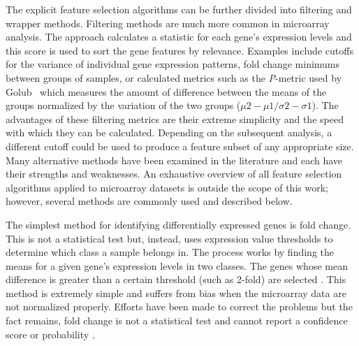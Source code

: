 {%
The explicit feature selection algorithms can be further divided into filtering
and wrapper methods. Filtering methods are much more common in microarray
analysis. The approach calculates a statistic for each gene's expression levels
and this score is used to sort the gene features by relevance.  Examples
include cutoffs for the variance of individual gene expression patterns, fold
change minimums between groups of samples, or calculated metrics such as the
\emph{P}-metric used by Golub \ea\ which measures the amount of difference
between the means of the groups normalized by the variation of the two groups
($\mu2 - \mu1 / \sigma2 - \sigma1$). The advantages of these filtering metrics
are their extreme simplicity and the speed with which they can be calculated.
Depending on the subsequent analysis, a different cutoff could be used to
produce a feature subset of any appropriate size.  Many alternative methods
have been examined in the literature and each have their strengths and
weaknesses.  An exhaustive overview of all feature selection algorithms applied
to microarray datasets is outside the scope of this work; however, several
methods are commonly used and described below. 






The simplest method for identifying differentially expressed genes is fold
change.  This is not a statistical test but, instead, uses expression value
thresholds to determine which class a sample belongs in.  The process works by
finding the means for a given gene's expression levels in two classes. The
genes whose mean difference is greater than a certain threshold (such as
2-fold) are selected \cite{derisi1997ema}.  This method is extremely simple and
suffers from bias when the microarray data are not normalized properly.
Efforts have been made to correct the problems but the fact remains, fold
change is not a statistical test and cannot report a confidence score or
probability \cite{yang2002wfa}.


}
